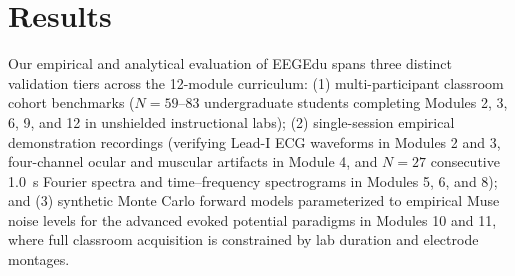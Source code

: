 \documentclass[11pt,letterpaper]{article}
\providecommand{\NSpectraEpochs}{27}
\begin{document}
\section{Results}
Our empirical and analytical evaluation of EEGEdu spans three distinct validation tiers across the 12-module curriculum: (1) multi-participant classroom cohort benchmarks ($N = 59\text{--}83$ undergraduate students completing Modules 2, 3, 6, 9, and 12 in unshielded instructional labs); (2) single-session empirical demonstration recordings (verifying Lead-I ECG waveforms in Modules 2 and 3, four-channel ocular and muscular artifacts in Module 4, and $N = \NSpectraEpochs$ consecutive 1.0~s Fourier spectra and time--frequency spectrograms in Modules 5, 6, and 8); and (3) synthetic Monte Carlo forward models parameterized to empirical Muse noise levels for the advanced evoked potential paradigms in Modules 10 and 11, where full classroom acquisition is constrained by lab duration and electrode montages.
\end{document}
